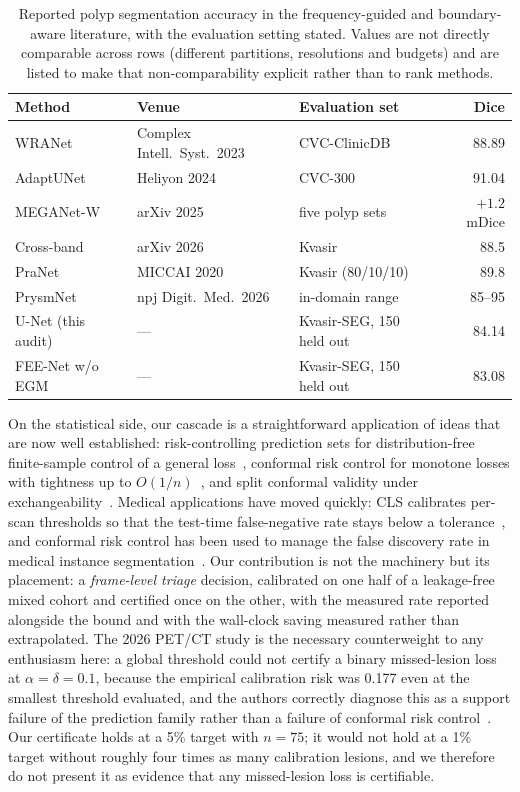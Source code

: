 \documentclass[journal]{IEEEtran}
\begin{document}
\begin{table}[t]
\centering
\caption{Reported polyp segmentation accuracy in the frequency-guided and boundary-aware literature, with the evaluation setting stated. Values are not directly comparable across rows (different partitions, resolutions and budgets) and are listed to make that non-comparability explicit rather than to rank methods.}
\label{tab:literature}
\scriptsize
\begin{tabular}{p{2.0cm}p{1.9cm}p{1.5cm}r}
\toprule
Method & Venue & Evaluation set & Dice \\
\midrule
WRANet~\cite{zhao2023wranet} & Complex Intell.\ Syst.\ 2023 & CVC-ClinicDB & 88.89 \\
AdaptUNet~\cite{rajasekar2024adaptunet} & Heliyon 2024 & CVC-300 & 91.04 \\
MEGANet-W~\cite{yeemeganet2025} & arXiv 2025 & five polyp sets & $+1.2$ mDice \\
Cross-band~\cite{oh2026crossband} & arXiv 2026 & Kvasir & 88.5 \\
PraNet~\cite{fan2020pranet} & MICCAI 2020 & Kvasir (80/10/10) & 89.8 \\
PrysmNet~\cite{xiao2026prysmnet} & npj Digit.\ Med.\ 2026 & in-domain range & 85--95 \\
\midrule
U-Net (this audit) & --- & Kvasir-SEG, 150 held out & 84.14 \\
FEE-Net w/o EGM & --- & Kvasir-SEG, 150 held out & 83.08 \\
\bottomrule
\end{tabular}
\end{table}

On the statistical side, our cascade is a straightforward application of ideas that are now well established: risk-controlling prediction sets for distribution-free finite-sample control of a general loss~\cite{bates2021rcps}, conformal risk control for monotone losses with tightness up to $O(1/n)$~\cite{angelopoulos2022crc}, and split conformal validity under exchangeability~\cite{angelopoulos2021gentle}. Medical applications have moved quickly: CLS calibrates per-scan thresholds so that the test-time false-negative rate stays below a tolerance~\cite{tan2025cls}, and conformal risk control has been used to manage the false discovery rate in medical instance segmentation~\cite{dai2025crcfdr}. Our contribution is not the machinery but its placement: a \emph{frame-level triage} decision, calibrated on one half of a leakage-free mixed cohort and certified once on the other, with the measured rate reported alongside the bound and with the wall-clock saving measured rather than extrapolated. The 2026 PET/CT study is the necessary counterweight to any enthusiasm here: a global threshold could not certify a binary missed-lesion loss at $\alpha=\delta=0.1$, because the empirical calibration risk was 0.177 even at the smallest threshold evaluated, and the authors correctly diagnose this as a support failure of the prediction family rather than a failure of conformal risk control~\cite{zheng2026crc}. Our certificate holds at a 5\% target with $n=75$; it would not hold at a 1\% target without roughly four times as many calibration lesions, and we therefore do not present it as evidence that any missed-lesion loss is certifiable.
\end{document}

